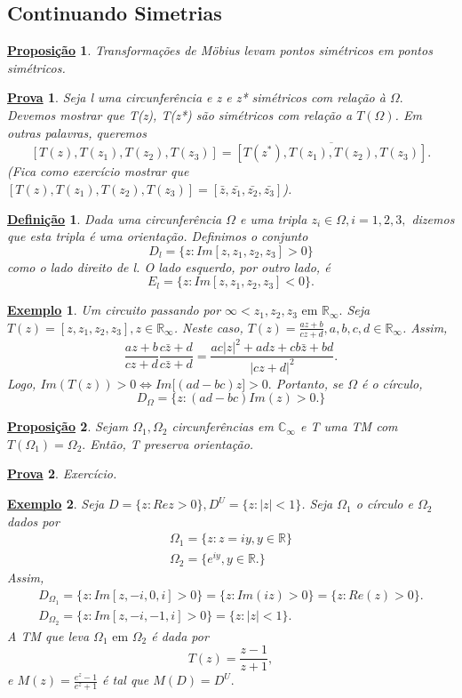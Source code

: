 \documentclass{article}
\newtheorem*{def*}{\underline{Defini\c c\~ao}}
\newtheorem{example}{\underline{Exemplo}}[section]
\newtheorem*{proof*}{\underline{Prova}}
\newtheorem*{prop*}{\underline{Proposi\c c\~ao}}
\begin{document}
  \subsection{Continuando Simetrias}
 \begin{prop*}
   Transforma\c c\~oes de M\"{o}bius levam pontos sim\'etricos em pontos sim\'etricos.
 \end{prop*}
 \begin{proof*}
  Seja l uma circunfer\^encia e z e z* sim\'etricos com rela\c c\~ao \`a $\Omega.$  Devemos mostrar que T(z), T(z*) s\~ao sim\'etricos
com rela\c c\~ao a $T(\Omega)$. Em outras palavras, queremos 
  $$
  [T(z), T(z_{1}), T(z_2), T(z_3)] = \overline{[T(z^*), T(z_1), T(z_2), T(z_3)]}.
  $$
  (Fica como exerc\'icio mostrar que $[T(z), T(z_{1}), T(z_2), T(z_3)] = [\bar{z}, \bar{z_1}, \bar{z_2}, \bar{z_3}]$).
\end{proof*}
\begin{def*}
  Dada uma circunfer\^encia $\Omega$ e uma tripla $z_{i}\in \Omega, i = 1, 2, 3,$ dizemos que esta tripla \'e uma orienta\c c\~ao.
Definimos o conjunto
  $$
    D_{l} = \{z: Im[z, z_1, z_2, z_3] > 0\}
  $$
  como o lado direito de l. O lado esquerdo, por outro lado, \'e 
  $$
    E_{l} = \{z: Im[z, z_1, z_2, z_3] < 0\}.
  $$
\end{def*}
 \begin{example}
   Um circuito passando por $\infty < z_1, z_2, z_3\text{ em }\mathbb{R}_\infty.$ Seja $T(z) = [z, z_1, z_2, z_3], z\in \mathbb{R}_\infty$. 
Neste caso, $T(z) = \frac{az + b}{cz + d}, a, b, c, d\in \mathbb{R}_\infty$. Assim, 
  $$
  \frac{az + b}{cz + d}\frac{c\bar{z} + d}{c\bar{z} + d} = \frac{ac|z|^2 + adz + cb\bar{z} + bd}{|cz+d|^2}.
  $$
  Logo, $Im(T(z)) > 0\Longleftrightarrow Im\biggl[(ad-bc)z\biggr] > 0.$ Portanto, se $\Omega$ \'e o c\'irculo,
  $$ 
  D_{\Omega} = \{z: (ad - bc)Im(z) > 0.\}
  $$
 \end{example}
 \begin{prop*}
   Sejam $\Omega_1, \Omega_2$ circunfer\^encias em $\mathbb{C}_\infty$ e T uma TM com $T(\Omega_1) = \Omega_2.$ Ent\~ao, T preserva
  orienta\c c\~ao.
 \end{prop*}
\begin{proof*}
  Exerc\'icio.
\end{proof*}
 \begin{example}
   Seja $D = \{z: Re z > 0\}, D^U = \{z: |z| < 1\} $. Seja $\Omega_1$ o c\'irculo e $\Omega_2$ dados por 
  \begin{align*}
    \Omega_1 = \{z: z = iy, y\in \mathbb{R}\} \\
    \Omega_2 = \{e^{iy}, y\in \mathbb{R}.\}
  \end{align*}
  Assim,
 \begin{align*}
   D_{\Omega_1} = \{z: Im[z, -i, 0, i] > 0\} = \{z: Im(iz) > 0\} = \{z: Re(z) > 0\}. \\
   D_{\Omega_2} = \{z: Im[z, -i, -1, i] > 0\} = \{z: |z| < 1\}.
 \end{align*}
 A TM que leva $\Omega_1\text{ em }\Omega_2$ \'e dada por
 $$
 T(z) = \frac{z-1}{z+1}, 
 $$
 e $M(z) = \frac{e^{z} - 1}{e^{z} + 1}$ \'e tal que $M(D) = D^U.$
\end{example}
\end{document}
